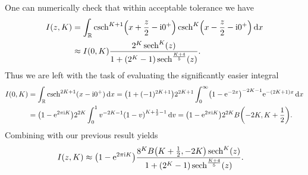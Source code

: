 \documentclass[english, parskip=full]{scrartcl}
\begin{document}
One can numerically check that within acceptable tolerance we have
\begin{align}
I(z,K) &= \intr{\csch^{K+1}\kla*{x + \frac{z}{2} - \i 0^+} \csch^{K}\kla*{x - \frac{z}{2} - \i 0^+}}{x}\\
&\approx I(0,K) \frac{2^K \sech^K(z)}{1 + (2^K-1) \sech^\frac{K+4}{5}(z)}.
\end{align}
Thus we are left with the task of evaluating the significantly easier integral
\begin{align}
I(0,K) &= \intr{\csch^{2K+1}(x-\i 0^+)}{x} = \kla*{1 + (-1)^{2K + 1}} 2^{2K+1} \intx{0}{\infty}{\kla*{1 - \powe{-2x}}^{-2K-1} \powe{-(2K+1)x}}{x}\\
&= \kla*{1 - \powe{2\pi\i K}} 2^{2K} \intx{0}{1}{v^{-2K-1} \kla*{1 - v}^{K + \frac{1}{2} -1}}{v} = \kla*{1 - \powe{2\pi\i K}} 2^{2K} B\kla*{-2K, K + \frac{1}{2}}.
\end{align}
Combining with our previous result yields
\begin{align}
I(z,K) &\approx \kla*{1 - \powe{2\pi\i K}} \frac{8^K B\kla*{K + \frac{1}{2}, -2K} \sech^K(z)}{1 + \kla*{2^K - 1} \sech^\frac{K+4}{5}(z)}.
\end{align}
\end{document}
